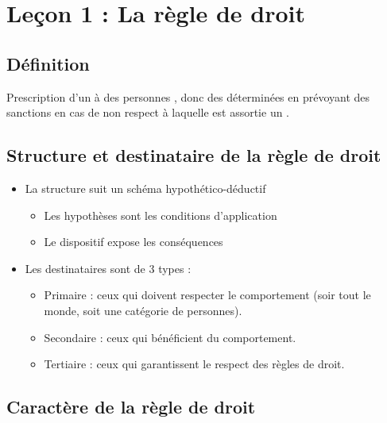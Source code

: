 \chapter{Leçon 1 : La règle de droit}

\section{Définition}

Prescription d'un  à des personnes , donc des  déterminées en prévoyant des sanctions en cas de non respect à laquelle est assortie un .

\section{Structure et destinataire de la règle de droit}

\begin{itemize}
    \item La structure suit un schéma hypothético-déductif
    \begin{itemize}
        \item Les hypothèses sont les conditions d'application
        \item Le dispositif expose les conséquences
    \end{itemize}
    \item Les destinataires sont de 3 types :
        \begin{itemize}
            \item Primaire : ceux qui doivent respecter le comportement (soir tout le monde, soit une catégorie de personnes).
            \item Secondaire : ceux qui bénéficient du comportement.
            \item Tertiaire : ceux qui garantissent le respect des règles de droit.
        \end{itemize}
\end{itemize}

\section{Caractère de la règle de droit}

